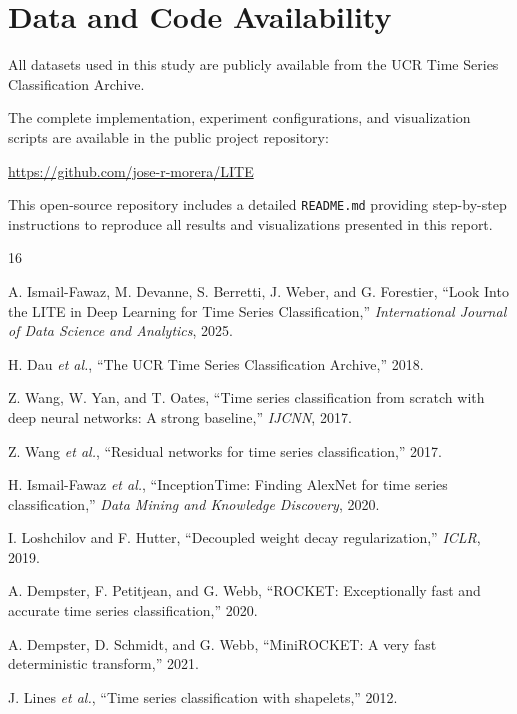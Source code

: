 \documentclass[conference]{IEEEtran}
\begin{document}
\section*{Data and Code Availability}

All datasets used in this study are publicly available from the UCR Time Series Classification Archive.

The complete implementation, experiment configurations, and visualization scripts are available in the public project repository:

\url{https://github.com/jose-r-morera/LITE}

This open-source repository includes a detailed \texttt{README.md} providing step-by-step instructions to reproduce all results and visualizations presented in this report.


    {\footnotesize
        \setlength{\itemsep}{0pt}
        \setlength{\parskip}{0pt}
        \begin{thebibliography}{16}

            A. Ismail-Fawaz, M. Devanne, S. Berretti, J. Weber, and G. Forestier,
            ``Look Into the LITE in Deep Learning for Time Series Classification,''
            \emph{International Journal of Data Science and Analytics}, 2025.

            H. Dau \emph{et al.},
            ``The UCR Time Series Classification Archive,''
            2018.

            Z. Wang, W. Yan, and T. Oates,
            ``Time series classification from scratch with deep neural networks: A strong baseline,''
            \emph{IJCNN}, 2017.

            Z. Wang \emph{et al.},
            ``Residual networks for time series classification,''
            2017.

            H. Ismail-Fawaz \emph{et al.},
            ``InceptionTime: Finding AlexNet for time series classification,''
            \emph{Data Mining and Knowledge Discovery}, 2020.

            I. Loshchilov and F. Hutter,
            ``Decoupled weight decay regularization,''
            \emph{ICLR}, 2019.

            A. Dempster, F. Petitjean, and G. Webb,
            ``ROCKET: Exceptionally fast and accurate time series classification,''
            2020.

            A. Dempster, D. Schmidt, and G. Webb,
            ``MiniROCKET: A very fast deterministic transform,''
            2021.

            J. Lines \emph{et al.},
            ``Time series classification with shapelets,''
            2012.


        \end{thebibliography}
    }
\end{document}

